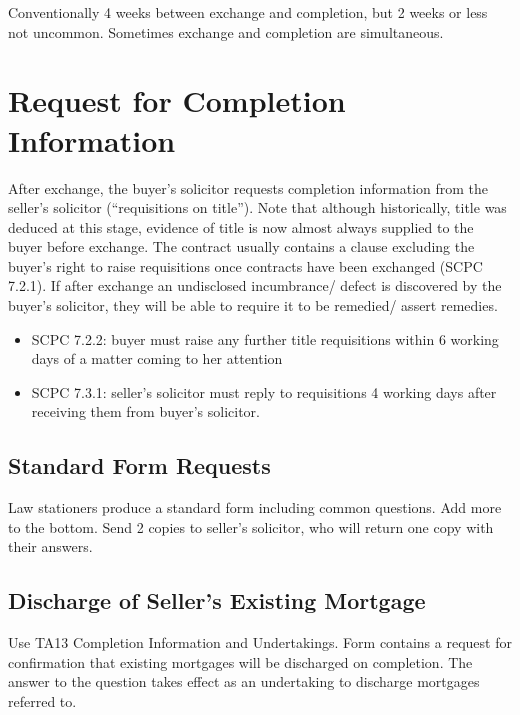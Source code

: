 \documentclass[
]{article}
\providecommand{\tightlist}{%
  \setlength{\itemsep}{0pt}\setlength{\parskip}{0pt}}
\begin{document}
Conventionally 4 weeks between exchange and completion, but 2 weeks or
less not uncommon. Sometimes exchange and completion are simultaneous.

\hypertarget{request-for-completion-information}{%
\section{Request for Completion
Information}\label{request-for-completion-information}}

After exchange, the buyer's solicitor requests completion information
from the seller's solicitor (``requisitions on title''). Note that
although historically, title was deduced at this stage, evidence of
title is now almost always supplied to the buyer before exchange. The
contract usually contains a clause excluding the buyer's right to raise
requisitions once contracts have been exchanged (SCPC 7.2.1). If after
exchange an undisclosed incumbrance/ defect is discovered by the buyer's
solicitor, they will be able to require it to be remedied/ assert
remedies.

\begin{itemize}
\tightlist
\item
  SCPC 7.2.2: buyer must raise any further title requisitions within 6
  working days of a matter coming to her attention
\item
  SCPC 7.3.1: seller's solicitor must reply to requisitions 4 working
  days after receiving them from buyer's solicitor.
\end{itemize}

\hypertarget{standard-form-requests}{%
\subsection{Standard Form Requests}\label{standard-form-requests}}

Law stationers produce a standard form including common questions. Add
more to the bottom. Send 2 copies to seller's solicitor, who will return
one copy with their answers.

\hypertarget{discharge-of-sellers-existing-mortgage}{%
\subsection{Discharge of Seller's Existing
Mortgage}\label{discharge-of-sellers-existing-mortgage}}

Use TA13 Completion Information and Undertakings. Form contains a
request for confirmation that existing mortgages will be discharged on
completion. The answer to the question takes effect as an undertaking to
discharge mortgages referred to.
\end{document}
